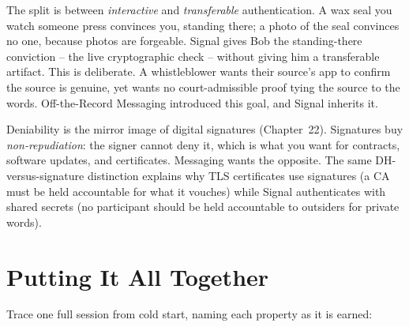 \begin{intuitionbox}
The split is between \emph{interactive} and \emph{transferable} authentication. A wax seal you watch someone press convinces you, standing there; a photo of the seal convinces no one, because photos are forgeable. Signal gives Bob the standing-there conviction -- the live cryptographic check -- without giving him a transferable artifact. This is deliberate. A whistleblower wants their source's app to confirm the source is genuine, yet wants no court-admissible proof tying the source to the words. Off-the-Record Messaging introduced this goal, and Signal inherits it.
\end{intuitionbox}

\begin{connectionbox}
Deniability is the mirror image of digital signatures (Chapter~22). Signatures buy \emph{non-repudiation}: the signer cannot deny it, which is what you want for contracts, software updates, and certificates. Messaging wants the opposite. The same DH-versus-signature distinction explains why TLS certificates use signatures (a CA must be held accountable for what it vouches) while Signal authenticates with shared secrets (no participant should be held accountable to outsiders for private words).
\end{connectionbox}

\section{Putting It All Together}
\label{ch27:summary}

Trace one full session from cold start, naming each property as it is earned:

